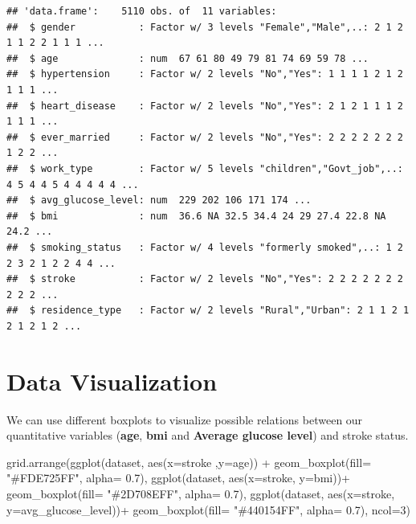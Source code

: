 \documentclass[
]{article}
\newenvironment{Shaded}{\begin{snugshade}}{\end{snugshade}}
\newcommand{\AttributeTok}[1]{\textcolor[rgb]{0.77,0.63,0.00}{#1}}
\newcommand{\DecValTok}[1]{\textcolor[rgb]{0.00,0.00,0.81}{#1}}
\newcommand{\FloatTok}[1]{\textcolor[rgb]{0.00,0.00,0.81}{#1}}
\newcommand{\FunctionTok}[1]{\textcolor[rgb]{0.00,0.00,0.00}{#1}}
\newcommand{\NormalTok}[1]{#1}
\newcommand{\SpecialCharTok}[1]{\textcolor[rgb]{0.00,0.00,0.00}{#1}}
\newcommand{\StringTok}[1]{\textcolor[rgb]{0.31,0.60,0.02}{#1}}
\begin{document}
\begin{verbatim}
## 'data.frame':    5110 obs. of  11 variables:
##  $ gender           : Factor w/ 3 levels "Female","Male",..: 2 1 2 1 1 2 2 1 1 1 ...
##  $ age              : num  67 61 80 49 79 81 74 69 59 78 ...
##  $ hypertension     : Factor w/ 2 levels "No","Yes": 1 1 1 1 2 1 2 1 1 1 ...
##  $ heart_disease    : Factor w/ 2 levels "No","Yes": 2 1 2 1 1 1 2 1 1 1 ...
##  $ ever_married     : Factor w/ 2 levels "No","Yes": 2 2 2 2 2 2 2 1 2 2 ...
##  $ work_type        : Factor w/ 5 levels "children","Govt_job",..: 4 5 4 4 5 4 4 4 4 4 ...
##  $ avg_glucose_level: num  229 202 106 171 174 ...
##  $ bmi              : num  36.6 NA 32.5 34.4 24 29 27.4 22.8 NA 24.2 ...
##  $ smoking_status   : Factor w/ 4 levels "formerly smoked",..: 1 2 2 3 2 1 2 2 4 4 ...
##  $ stroke           : Factor w/ 2 levels "No","Yes": 2 2 2 2 2 2 2 2 2 2 ...
##  $ residence_type   : Factor w/ 2 levels "Rural","Urban": 2 1 1 2 1 2 1 2 1 2 ...
\end{verbatim}

\newpage

\section{ Data Visualization}

We can use different boxplots to visualize possible relations between
our quantitative variables (\textbf{age}, \textbf{bmi} and
\textbf{Average glucose level}) and stroke status.\\

\begin{Shaded}
\begin{Highlighting}[]
\FunctionTok{grid.arrange}\NormalTok{(}\FunctionTok{ggplot}\NormalTok{(dataset, }\FunctionTok{aes}\NormalTok{(}\AttributeTok{x=}\NormalTok{stroke ,}\AttributeTok{y=}\NormalTok{age)) }\SpecialCharTok{+}
              \FunctionTok{geom\_boxplot}\NormalTok{(}\AttributeTok{fill=} \StringTok{"\#FDE725FF"}\NormalTok{, }\AttributeTok{alpha=} \FloatTok{0.7}\NormalTok{), }
            \FunctionTok{ggplot}\NormalTok{(dataset, }\FunctionTok{aes}\NormalTok{(}\AttributeTok{x=}\NormalTok{stroke, }\AttributeTok{y=}\NormalTok{bmi))}\SpecialCharTok{+}
              \FunctionTok{geom\_boxplot}\NormalTok{(}\AttributeTok{fill=} \StringTok{"\#2D708EFF"}\NormalTok{, }\AttributeTok{alpha=} \FloatTok{0.7}\NormalTok{), }
            \FunctionTok{ggplot}\NormalTok{(dataset, }\FunctionTok{aes}\NormalTok{(}\AttributeTok{x=}\NormalTok{stroke, }\AttributeTok{y=}\NormalTok{avg\_glucose\_level))}\SpecialCharTok{+}
              \FunctionTok{geom\_boxplot}\NormalTok{(}\AttributeTok{fill=} \StringTok{"\#440154FF"}\NormalTok{, }\AttributeTok{alpha=} \FloatTok{0.7}\NormalTok{), }
            \AttributeTok{ncol=}\DecValTok{3}\NormalTok{)}
\end{Highlighting}
\end{Shaded}
\end{document}

